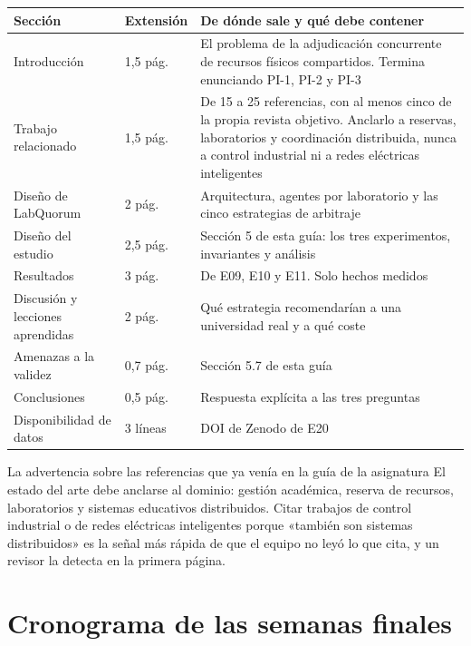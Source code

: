 \documentclass[11pt,a4paper]{article}
\begin{document}
\begin{center}
	\small
	\begin{tabular}{@{}p{3.8cm}p{1.7cm}p{9.3cm}@{}}
		\toprule
		\textbf{Sección} & \textbf{Extensión} & \textbf{De dónde sale y qué debe contener} \\
		\midrule
		Introducción & 1,5 pág. & El problema de la adjudicación concurrente de recursos físicos compartidos. Termina enunciando PI-1, PI-2 y PI-3 \\
		\addlinespace
		Trabajo relacionado & 1,5 pág. & De 15 a 25 referencias, con al menos cinco de la propia revista objetivo. Anclarlo a reservas, laboratorios y coordinación distribuida, nunca a control industrial ni a redes eléctricas inteligentes \\
		\addlinespace
		Diseño de LabQuorum & 2 pág. & Arquitectura, agentes por laboratorio y las cinco estrategias de arbitraje \\
		\addlinespace
		Diseño del estudio & 2,5 pág. & Sección 5 de esta guía: los tres experimentos, invariantes y análisis \\
		\addlinespace
		Resultados & 3 pág. & De E09, E10 y E11. Solo hechos medidos \\
		\addlinespace
		Discusión y lecciones aprendidas & 2 pág. & Qué estrategia recomendarían a una universidad real y a qué coste \\
		\addlinespace
		Amenazas a la validez & 0,7 pág. & Sección 5.7 de esta guía \\
		\addlinespace
		Conclusiones & 0,5 pág. & Respuesta explícita a las tres preguntas \\
		\addlinespace
		Disponibilidad de datos & 3 líneas & DOI de Zenodo de E20 \\
		\bottomrule
	\end{tabular}
\end{center}

\begin{aviso}{La advertencia sobre las referencias que ya venía en la guía de la asignatura}
	El estado del arte debe anclarse al dominio: gestión académica, reserva de recursos, laboratorios y sistemas educativos distribuidos. Citar trabajos de control industrial o de redes eléctricas inteligentes porque «también son sistemas distribuidos» es la señal más rápida de que el equipo no leyó lo que cita, y un revisor la detecta en la primera página.
\end{aviso}

\section{Cronograma de las semanas finales}
\end{document}
